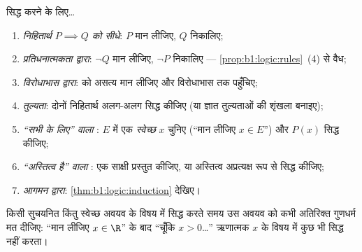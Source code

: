 \begin{method}[उपपत्ति के मानक प्रारूप]\label{met:b1:logic:proofs}
सिद्ध करने के लिए\dots
\begin{enumerate}
  \item \emph{निहितार्थ $P \implies Q$ को सीधे}: $P$ मान लीजिए, $Q$ निकालिए;
  \item \emph{प्रतिधनात्मकता द्वारा}: $\lnot Q$ मान लीजिए, $\lnot P$ निकालिए
  --- \cref{prop:b1:logic:rules}~(4) से वैध;
  \item \emph{विरोधाभास द्वारा}:  को असत्य मान लीजिए और विरोधाभास तक
  पहुँचिए;
  \item \emph{तुल्यता}: दोनों निहितार्थ अलग-अलग सिद्ध कीजिए (या ज्ञात
  तुल्यताओं की शृंखला बनाइए);
  \item \emph{``सभी के लिए'' वाला }: $E$ में एक \emph{स्वेच्छ} $x$ चुनिए
  (``मान लीजिए $x \in E$'') और $P(x)$ सिद्ध कीजिए;
  \item \emph{``अस्तित्व है'' वाला }: एक साक्षी प्रस्तुत कीजिए, या
  अस्तित्व अप्रत्यक्ष रूप से सिद्ध कीजिए;
  \item \emph{आगमन द्वारा}: \cref{thm:b1:logic:induction} देखिए।
\end{enumerate}
किसी सुचयनित किंतु स्वेच्छ अवयव के विषय में  सिद्ध करते समय उस अवयव को
कभी अतिरिक्त गुणधर्म मत दीजिए: ``मान लीजिए $x \in \R$'' के बाद ``चूँकि $x >
0$\dots'' ऋणात्मक $x$ के विषय में कुछ भी सिद्ध नहीं करता।
\end{method}


